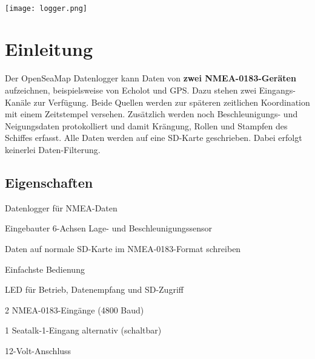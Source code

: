 \documentclass[pdftex, 8pt, paper=130mm:92mm,pagesize]{scrartcl}
\newcommand{\titel}{OpenSeaMap-Datenlogger}
\newcommand{\untertitel}{Bedienungs- und Installationsanleitung}
\newcommand{\autor}{Wilfried Klaas}
\newcommand{\firma}{OpenSeaMap Projekt}
\newcommand{\documentnr}{V0.1}
\let\stdsection\section
\renewcommand\section{\newpage\stdsection}
\begin{document}

\begin{titlepage}
	\raggedleft\textbf{\color{darkblue}{\Large \titel \\ \untertitel}}\\
	\vspace{6mm}
	\color{darkblue}{\hrule height2pt}
	\vspace{2mm}
	\centerline{\texttt{[image: logger.png]}}
\end{titlepage}

\tableofcontents
\clearpage
{}



\section{Einleitung}

Der OpenSeaMap Datenlogger kann Daten von \textbf{zwei NMEA-0183-Geräten} aufzeichnen, beispielsweise von Echolot und GPS. Dazu stehen zwei Eingangs-Kanäle zur Verfügung. Beide Quellen werden zur späteren zeitlichen Koordination mit einem Zeitstempel versehen. Zusätzlich werden noch Beschleunigungs- und Neigungsdaten protokolliert und damit Krängung, Rollen und Stampfen des Schiffes erfasst. Alle Daten werden auf eine SD-Karte geschrieben. Dabei erfolgt keinerlei Daten-Filterung. 

\subsection{Eigenschaften}

\begin{compactitem}
\item Datenlogger für NMEA-Daten 
\item Eingebauter 6-Achsen Lage- und Beschleunigungssensor
\item Daten auf normale SD-Karte im NMEA-0183-Format schreiben
\item Einfachste Bedienung
\item LED für Betrieb, Datenempfang und SD-Zugriff
\item 2 NMEA-0183-Eingänge (4800 Baud)
\item 1 Seatalk-1-Eingang alternativ (schaltbar) 
\item 12-Volt-Anschluss
\end{compactitem}
\end{document}
